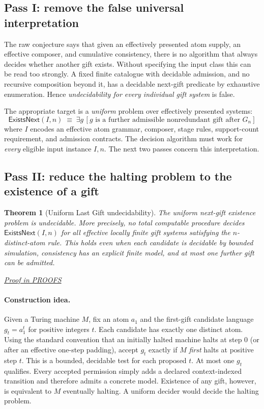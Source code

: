 \documentclass[11pt,letterpaper]{article}
\newtheorem{theorem}{Theorem}[section]
\theoremstyle{definition}\newtheorem{definition}[theorem]{Definition}\newtheorem{example}[theorem]{Example}
\theoremstyle{remark}\newtheorem{remark}[theorem]{Remark}
\newcommand{\Exists}{\mathsf{ExistsNext}}
\newcommand{\proofat}[1]{\par\smallskip\noindent\hfill\textit{\hyperref[#1]{Proof in PROOFS}}}
\begin{document}
\subsection{Pass I: remove the false universal interpretation}
The raw conjecture says that given an effectively presented atom supply, an effective composer, and cumulative consistency, there is no algorithm that always decides whether another gift exists. Without specifying the input class this can be read too strongly. A fixed finite catalogue with decidable admission, and no recursive composition beyond it, has a decidable next-gift predicate by exhaustive enumeration. Hence \emph{undecidability for every individual gift system} is false.

The appropriate target is a \emph{uniform} problem over effectively presented systems:
\[
\Exists(I,n)\;\equiv\;\exists g\,[g\text{ is a further admissible nonredundant gift after }G_n]
\]
where $I$ encodes an effective atom grammar, composer, stage rules, support-count requirement, and admission contracts. The decision algorithm must work for \emph{every} eligible input instance $I,n$. The next two passes concern this interpretation.

\subsection{Pass II: reduce the halting problem to the existence of a gift}
\begin{theorem}[Uniform Last Gift undecidability]\label{w0:thm:next}
The uniform next-gift existence problem is undecidable. More precisely, no total computable procedure decides $\Exists(I,n)$ for all effective locally finite gift systems satisfying the $n$-distinct-atom rule. This holds even when each candidate is decidable by bounded simulation, consistency has an explicit finite model, and at most one further gift can be admitted.\proofat{w0:pr:next}
\end{theorem}

\paragraph{Construction idea.} Given a Turing machine $M$, fix an atom $a_1$ and the first-gift candidate language $g_t=a_1^t$ for positive integers $t$. Each candidate has exactly one distinct atom. Using the standard convention that an initially halted machine halts at step $0$ (or after an effective one-step padding), accept $g_t$ exactly if $M$ \emph{first} halts at positive step $t$. This is a bounded, decidable test for each proposed $t$. At most one $g_t$ qualifies. Every accepted permission simply adds a declared context-indexed transition and therefore admits a concrete model. Existence of any gift, however, is equivalent to $M$ eventually halting. A uniform decider would decide the halting problem.
\end{document}
